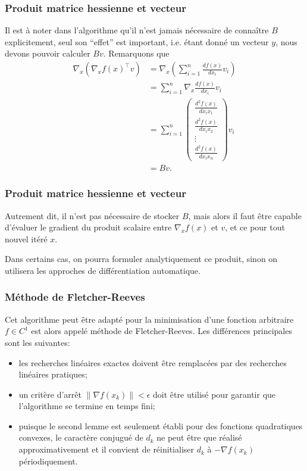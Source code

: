 \documentclass[usepdftitle=false,aspectratio=169]{beamer}
\begin{document}
\begin{frame}
\frametitle{Produit matrice hessienne et vecteur}

Il est à noter dans l'algorithme qu'il n'est jamais nécessaire de connaître $B$ explicitement, seul son ``effet'' est important, i.e. étant donné un vecteur $y$, nous devons pouvoir calculer $Bv$.
Remarquons que
\begin{align*}
\nabla_x (\nabla_x f(x)^\top v) &= \nabla_x \left( \sum_{i = 1}^n \frac{df(x)}{dx_i} v_i \right) \\
&= \sum_{i = 1}^n \nabla_x \frac{df(x)}{dx_i} v_i \\
&= \sum_{i = 1}^n \begin{pmatrix} \frac{d^2f(x)}{dx_ix_1} \\ \frac{d^2f(x)}{dx_ix_2} \\ \vdots \\ \frac{d^2f(x)}{dx_ix_n} \end{pmatrix} v_i \\
&= Bv.
\end{align*}
	
\end{frame}

\begin{frame}
\frametitle{Produit matrice hessienne et vecteur}

Autrement dit, il n'est pas nécessaire de stocker $B$, mais alors il faut être capable d'évaluer le gradient du produit scalaire entre $\nabla_x f(x)$ et $v$, et ce pour tout nouvel itéré $x$.

\mbox{}

Dans certains cas, on pourra formuler analytiquement ce produit, sinon on utilisera les approches de différentiation automatique.

\end{frame}

\begin{frame}
	\frametitle{Méthode de Fletcher-Reeves}
	
	Cet algorithme peut être adapté pour la minimisation d'une fonction arbitraire $f \in C^1$ est alors appelé méthode de Fletcher-Reeves.
	Les différences principales sont les suivantes:
	\begin{itemize}
		\item
		les recherches linéaires exactes doivent être remplacées par des recherches linéaires pratiques;
		\item
		un critère d'arrêt $\| \nabla f(x_k) \| < \epsilon$ doit être utilisé pour garantir que l'algorithme se termine en temps fini;
		\item
		puisque le second lemme est seulement établi pour des fonctions quadratiques convexes, le caractère conjugué de $d_k$ ne peut être que réalisé approximativement et il convient de réinitialiser $d_k$ à $-\nabla f(x_k)$ périodiquement.
	\end{itemize}
	
\end{frame}
\end{document}
